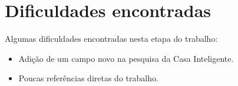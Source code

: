 \section{Dificuldades encontradas}\label{diff}
Algumas dificuldades encontradas nesta etapa do trabalho:

\begin{itemize}
\item Adição de um campo novo na pesquisa da Casa Inteligente.
\item Poucas referências diretas do trabalho.
\end{itemize}